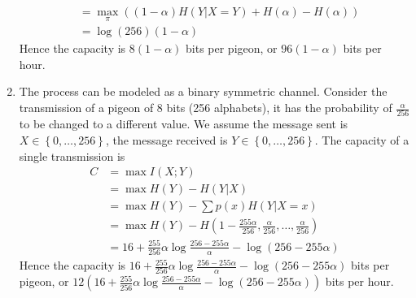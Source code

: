 \begin{exercise}
\begin{solution}
\begin{enumerate}
{\begin{equation}
\begin{aligned}
        &=\max _{\pi}((1-\alpha) H(Y|X = Y)+H(\alpha)-H(\alpha))\\
        &=\log(256) (1- \alpha)
      \end{aligned}
    \end{equation}  
    Hence the capacity is $8(1-\alpha)$ bits per pigeon, or $96(1-\alpha)$ bits per hour.
    }
    \item { The process can be modeled as a binary symmetric channel. Consider the transmission of a pigeon of 8 bits (256 alphabets), it has the probability of $\frac{\alpha}{256}$ to be changed to a different value. We assume the message sent is $X \in \left\{0, \ldots, 256 \right\}$, the message received is $Y \in \left\{0, \ldots, 256\right\}$. The capacity of a single transmission is
    \begin{equation}
      \begin{aligned}
        C&=\max I(X ; Y) \\
 &=\max H(Y)-H(Y | X) \\
 &=\max H(Y)-\sum p(x) H(Y | X=x) \\
 &=\max H(Y)-H\left(1 - \frac{255\alpha}{256}, \frac{\alpha}{256}, \ldots, \frac{\alpha}{256}\right) \\
 &= 16 + \frac{255}{256}\alpha \log \frac{256-255\alpha}{\alpha} - \log (256 - 255\alpha) 
        \end{aligned}
    \end{equation}  
    Hence the capacity is $16 + \frac{255}{256}\alpha \log \frac{256-255\alpha}{\alpha} - \log (256 - 255\alpha)$ bits per pigeon, or $12(16 + \frac{255}{256}\alpha \log \frac{256-255\alpha}{\alpha} - \log (256 - 255\alpha))$ bits per hour.
    
    }
  \end{enumerate}
  \end{solution}
  \label{ex1}
\end{exercise}

